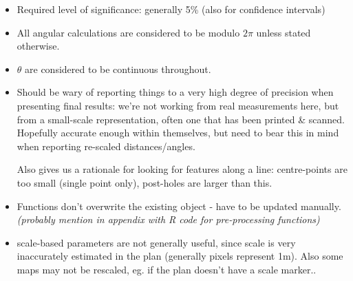 \documentclass[10pt,fleqn]{article}
\numberwithin{equation}{section}
\begin{document}
\begin{itemize}
\item
Required level of significance: generally 5\% (also for confidence intervals)

\item
All angular calculations are considered to be modulo $2\pi$ unless stated otherwise.

\item
$\theta$ are considered to be continuous throughout.

\item
Should be wary of reporting things to a very high degree of precision when presenting final results: we're not working from real measurements here, but from a small-scale representation, often one that has been printed \& scanned. Hopefully accurate enough within themselves, but need to bear this in mind when reporting re-scaled distances/angles.

Also gives us a rationale for looking for features along a line: centre-points are too small (single point only), post-holes are larger than this.

\item
Functions don't overwrite the existing object - have to be updated manually.
\textit{(probably mention in appendix with R code for pre-processing functions)
}

\item
scale-based parameters are not generally useful, since scale is very inaccurately estimated in the plan (generally  pixels represent 1m). Also some maps may not be rescaled, eg. if the plan doesn't have a scale marker..

\end{itemize}
\newpage



\newpage
\tableofcontents


\newpage


\newpage


\newpage


\newpage


\newpage

%


\newpage
\end{document}
